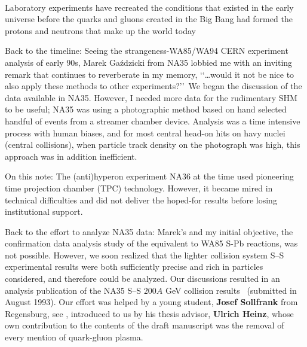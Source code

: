 \\[-0.7cm]
%
\begin{mdframed}[linecolor=gray,roundcorner=12pt,backgroundcolor=Dandelion!15,linewidth=1pt,leftmargin=0cm,rightmargin=0cm,topline=true,bottomline=true,skipabove=12pt]
\relax
%
Laboratory experiments have recreated the conditions that existed in the early universe before the quarks and gluons created in the Big Bang had formed the protons and neutrons that make up the world today
%
\end{mdframed}

Back to the timeline: Seeing the strangeness-WA85/WA94 CERN experiment analysis of early 90s, Marek Ga\'zdzicki from NA35 lobbied me with an inviting remark that continues to reverberate in my memory, \lq\lq \ldots would it not be nice to also apply these methods to other experiments?\rq\rq\ We began the discussion of the data available in NA35. However, I needed more data for the rudimentary SHM to be useful; NA35 was using a photographic method based on hand selected handful of events from a streamer chamber device. Analysis was a time intensive process with human biases, and for most central head-on hits on havy nuclei (central collisions), when particle track density on the photograph was high, this approach was in addition inefficient. 

On this note: The (anti)hyperon experiment NA36 at the time used pioneering time projection chamber (TPC) technology. However, it became mired in technical difficulties and did not deliver the hoped-for results before losing institutional support.

Back to the effort to analyze NA35 data: Marek\rq s and my initial objective, the confirmation data analysis study of the equivalent to WA85 S-Pb reactions, was not possible. However, we soon realized that the lighter collision system S--S experimental results were both sufficiently precise and rich in particles considered, and therefore could be analyzed. Our discussions resulted in an analysis publication of the NA35 S--S $200 A$ GeV collision results~\cite{Sollfrank:1993wn} (submitted in August 1993). Our effort was helped by a young student, \textbf{Josef Sollfrank} from Regensburg, see , introduced to us by his thesis advisor, \textbf{Ulrich Heinz}\label{UHentro}, whose own contribution to the contents of the draft manuscript was the removal of every mention of quark-gluon plasma. \\

